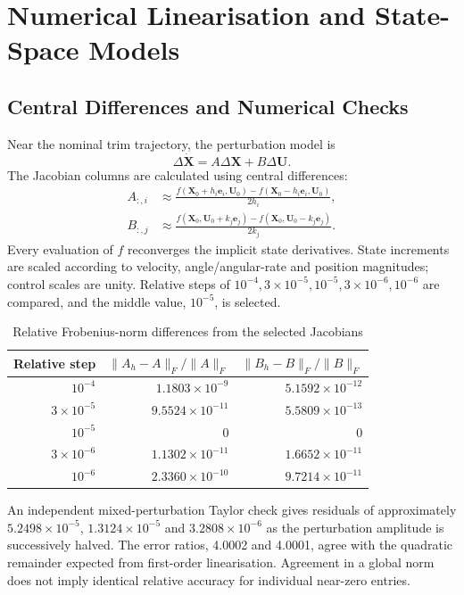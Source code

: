\documentclass[a4paper,11pt]{article}
\begin{document}
\section{Numerical Linearisation and State-Space Models}
\subsection{Central Differences and Numerical Checks}
Near the nominal trim trajectory, the perturbation model is
\begin{equation}\label{eq:ss}
\Delta\dot{\bm X}=A\Delta\bm X+B\Delta\bm U.
\end{equation}
The Jacobian columns are calculated using central differences:
\begin{align}
A_{:,i}&\approx\frac{f(\bm X_0+h_i\bm e_i,\bm U_0)-f(\bm X_0-h_i\bm e_i,\bm U_0)}{2h_i},\\
B_{:,j}&\approx\frac{f(\bm X_0,\bm U_0+k_j\bm e_j)-f(\bm X_0,\bm U_0-k_j\bm e_j)}{2k_j}.
\end{align}
Every evaluation of $f$ reconverges the implicit state derivatives. State increments are scaled according to velocity, angle/angular-rate and position magnitudes; control scales are unity. Relative steps of $10^{-4},3\times10^{-5},10^{-5},3\times10^{-6},10^{-6}$ are compared, and the middle value, $10^{-5}$, is selected.

\begin{table}[H]\centering
\caption{Relative Frobenius-norm differences from the selected Jacobians}
\begin{tabular}{rrr}\toprule
Relative step&$\|A_h-A\|_F/\|A\|_F$&$\|B_h-B\|_F/\|B\|_F$\\\midrule
$10^{-4}$&$1.1803\times10^{-9}$&$5.1592\times10^{-12}$\\
$3\times10^{-5}$&$9.5524\times10^{-11}$&$5.5809\times10^{-13}$\\
$10^{-5}$&$0$&$0$\\
$3\times10^{-6}$&$1.1302\times10^{-11}$&$1.6652\times10^{-11}$\\
$10^{-6}$&$2.3360\times10^{-10}$&$9.7214\times10^{-11}$\\\bottomrule
\end{tabular}
\end{table}
An independent mixed-perturbation Taylor check gives residuals of approximately $5.2498\times10^{-5}$, $1.3124\times10^{-5}$ and $3.2808\times10^{-6}$ as the perturbation amplitude is successively halved. The error ratios, 4.0002 and 4.0001, agree with the quadratic remainder expected from first-order linearisation. Agreement in a global norm does not imply identical relative accuracy for individual near-zero entries.
\end{document}
